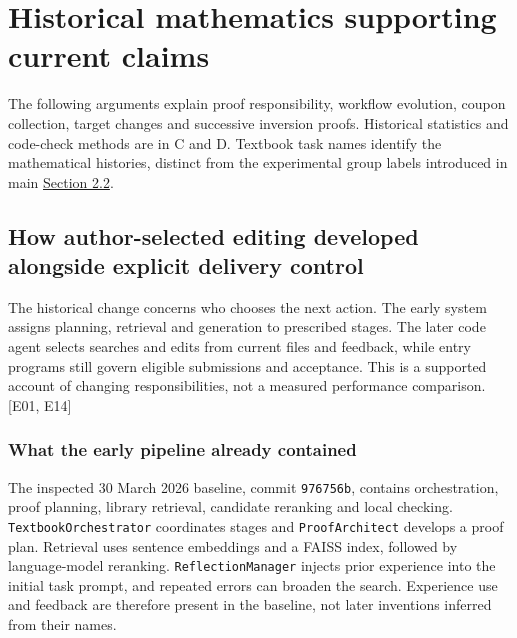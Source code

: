 \section[Historical mathematics supporting current claims]{\texorpdfstring{\protect\hypertarget{appendix-l}{}Historical mathematics supporting current claims}{Historical mathematics supporting current claims}}
The following arguments explain proof responsibility, workflow evolution, coupon collection, target changes and successive inversion proofs. Historical statistics and code-check methods are in C and D. Textbook task names identify the mathematical histories, distinct from the experimental group labels introduced in main \href{en.pdf\#section-2-2}{Section 2.2}.

\subsection[How author-selected editing developed alongside explicit delivery control]{\texorpdfstring{\protect\hypertarget{l1}{}How author-selected editing developed alongside explicit delivery control}{How author-selected editing developed alongside explicit delivery control}}
The historical change concerns who chooses the next action. The early system assigns planning, retrieval and generation to prescribed stages. The later code agent selects searches and edits from current files and feedback, while entry programs still govern eligible submissions and acceptance. This is a supported account of changing responsibilities, not a measured performance comparison. [E01, E14]

\subsubsection[What the early pipeline already contained]{\texorpdfstring{\protect\hypertarget{l1-1}{}What the early pipeline already contained}{What the early pipeline already contained}}
The inspected 30 March 2026 baseline, commit \nolinkurl{976756b}, contains orchestration, proof planning, library retrieval, candidate reranking and local checking. \nolinkurl{TextbookOrchestrator} coordinates stages and \nolinkurl{ProofArchitect} develops a proof plan. Retrieval uses sentence embeddings and a FAISS index, followed by language-model reranking. \nolinkurl{ReflectionManager} injects prior experience into the initial task prompt, and repeated errors can broaden the search. Experience use and feedback are therefore present in the baseline, not later inventions inferred from their names.


